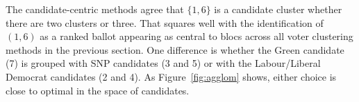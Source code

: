 \documentclass{amsart}
\newcommand{\dcand}{D_B}
\newcommand{\dcandbar}{\overline{D}_B}
\theoremstyle{plain}
\theoremstyle{definition}
\theoremstyle{remark}
\begin{document}
The candidate-centric methods agree that 
$\{1,6\}$ is a candidate cluster whether there are two clusters or three.  That squares well with the identification of $(1,6)$ as a ranked ballot appearing as central to blocs across all voter clustering methods in the previous section.  One difference is whether the Green candidate (7) is grouped with SNP candidates (3 and 5) or with the Labour/Liberal Democrat candidates (2 and 4).  As Figure~\ref{fig:agglom} shows, either choice is close to optimal in the space of candidates.


\end{document}
